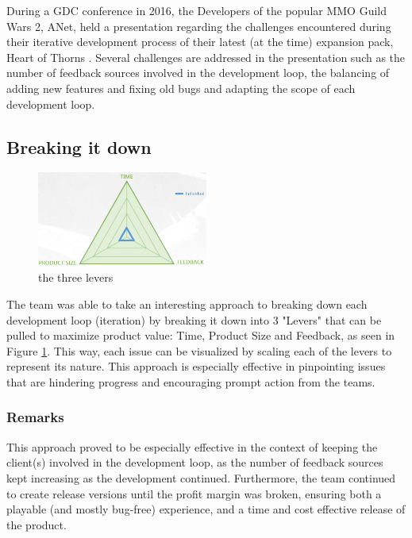 \documentclass{scrartcl}
\begin{document}
    During a GDC conference in 2016, the Developers of the popular MMO Guild Wars 2, ANet, held a presentation regarding the challenges encountered during their iterative development process of their latest (at the time) expansion pack, Heart of Thorns \cite{GW2}. Several challenges are addressed in the presentation such as the number of feedback sources involved in the development loop, the balancing of adding new features and fixing old bugs and adapting the scope of each development loop.
    
    \newpage
    
    \subsection{Breaking it down}
    
    \begin{figure}
        \centering
        \includegraphics[width=0.5\textwidth]{Loop.jpg}
        \caption{the three levers}
        \label{fig:loop}
    \end{figure}
    
    The team was able to take an interesting approach to breaking down each development loop (iteration) by breaking it down into 3 "Levers" that can be pulled to maximize product value: Time, Product Size and Feedback, as seen in Figure \ref{fig:loop}. This way, each issue can be visualized by scaling each of the levers to represent its nature. This approach is especially effective in pinpointing issues that are hindering progress and encouraging prompt action from the teams.
    
    \subsubsection{Remarks}
    
    This approach proved to be especially effective in the context of keeping the client(s) involved in the development loop, as the number of feedback sources kept increasing as the development continued. Furthermore, the team continued to create release versions until the profit margin was broken, ensuring both a playable (and mostly bug-free) experience, and a time and cost effective release of the product.
    
\end{document}
